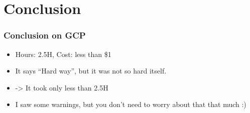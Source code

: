 \documentclass[aspectratio=169,11pt,hyperref={colorlinks=true}]{beamer}
\begin{document}
\section{Conclusion}
\begin{frame}
  \frametitle{Conclusion on GCP}
  \begin{itemize}
    \item Hours: 2.5H, Cost: less than \$1
    \item It says ``Hard way'', but it was not so hard itself.
    \item[]  -> It took only less than 2.5H
    \item I saw some warnings, but you don't need to worry about that that much :)
  \end{itemize}
\end{frame}
\end{document}
